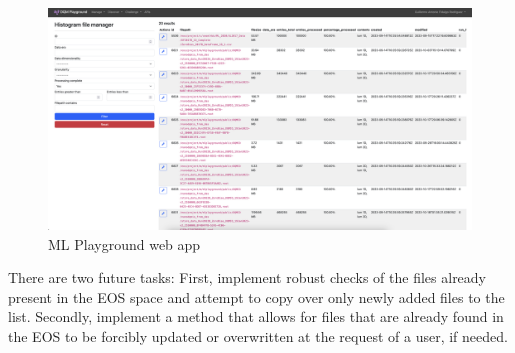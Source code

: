 \begin{figure}
	\centering
	\includegraphics*[width=\linewidth,trim = 1cm 5.2in 13.6in 0]{Images/MLP.png}
	\caption{ML Playground web app}
	\label{fig:MLplayground}
\end{figure}


There are two future tasks: First, implement robust checks of the files already present in the EOS space and attempt to copy over only newly added files to the list.
Secondly, implement a method that allows for files that are already found in the EOS to be forcibly updated or overwritten at the request of a user, if needed.
